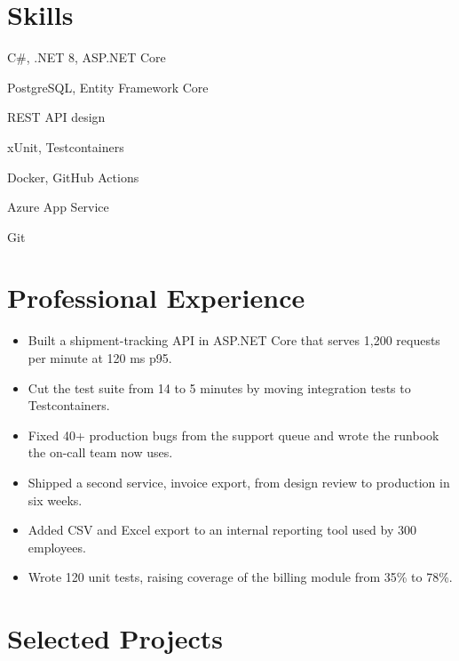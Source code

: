\documentclass{milanovic-resume}
\begin{document}
\makeheader

\section{Skills}
\begin{skills}
  \item C\#, .NET 8, ASP.NET Core
  \item PostgreSQL, Entity Framework Core
  \item REST API design
  \item xUnit, Testcontainers
  \item Docker, GitHub Actions
  \item Azure App Service
  \item Git
\end{skills}

\section{Professional Experience}

\begin{itemize}
  \item Built a shipment-tracking API in ASP.NET Core that serves 1,200 requests per minute at 120 ms p95.
  \item Cut the test suite from 14 to 5 minutes by moving integration tests to Testcontainers.
  \item Fixed 40+ production bugs from the support queue and wrote the runbook the on-call team now uses.
  \item Shipped a second service, invoice export, from design review to production in six weeks.
\end{itemize}

\begin{itemize}
  \item Added CSV and Excel export to an internal reporting tool used by 300 employees.
  \item Wrote 120 unit tests, raising coverage of the billing module from 35\% to 78\%.
\end{itemize}

\section{Selected Projects}
\end{document}

